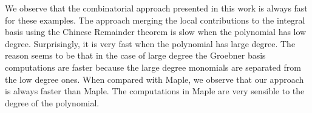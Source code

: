 \documentclass[a4paper,11pt]{amsart}%
\theoremstyle{definition}
\theoremstyle{plain}
\theoremstyle{remark}
\begin{document}
We observe that the combinatorial approach presented in this work is always fast for these examples. The approach merging the local contributions to the integral basis using the Chinese Remainder theorem is slow when the polynomial has low degree. Surprisingly, it is very fast when the polynomial has large degree. The reason seems to be that in the case of large degree the Groebner basis computations are faster because the large degree monomials are separated from the low degree ones. When compared with Maple, we observe that our approach is always faster than Maple. The computations in Maple are very sensible to the degree of the polynomial.



\end{document}
